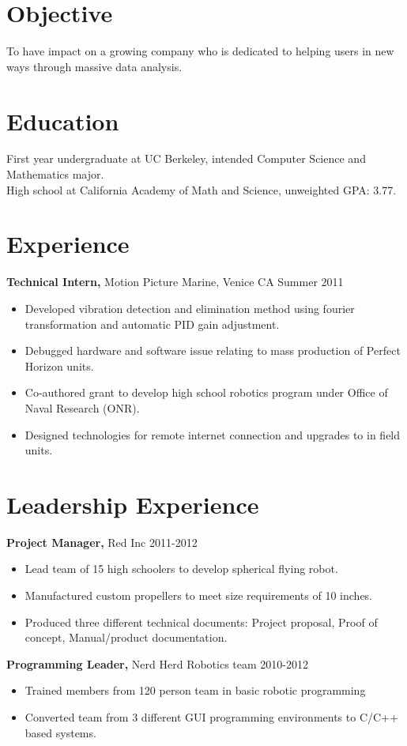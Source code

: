\documentclass[margin]{res}
\begin{document}
\begin{resume}

\section{Objective}
To have impact on a growing company who is dedicated to helping users in new ways through massive data analysis.

\section{Education}
First year undergraduate at UC Berkeley, intended Computer Science and Mathematics major. \\
High school at California Academy of Math and Science, unweighted GPA: 3.77.


\section{Experience}
{\bf Technical Intern,} Motion Picture Marine, Venice CA \hfill Summer 2011
\begin{itemize} \itemsep -2pt  %
  \item Developed vibration detection and elimination method using fourier transformation and automatic PID gain adjustment.
  \item Debugged hardware and software issue relating to mass production of Perfect Horizon units.
  \item Co-authored grant to develop high school robotics program under Office of Naval Research (ONR).
  \item Designed technologies for remote internet connection and upgrades to in field units.
\end{itemize}


\section{Leadership Experience}
{\bf Project Manager,} Red Inc \hfill 2011-2012
\begin{itemize} \itemsep -2pt
  \item Lead team of 15 high schoolers to develop spherical flying robot.
  \item Manufactured custom propellers to meet size requirements of 10 inches.
  \item Produced three different technical documents: Project proposal, Proof of concept, Manual/product documentation.
\end{itemize}
{\bf Programming Leader,} Nerd Herd Robotics team \hfill 2010-2012
\begin{itemize} \itemsep -2pt
  \item Trained members from 120 person team in basic robotic programming
  \item Converted team from 3 different GUI programming environments to C/C++ based systems.
\end{itemize}


\end{resume}
\end{document}
